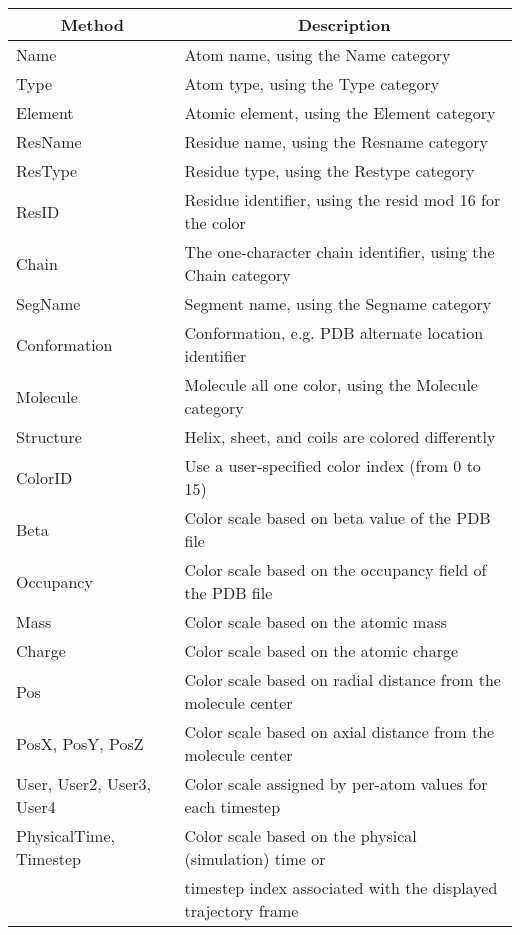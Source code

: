 \begin{table}[htb]
  \begin{tabular}{|l|l|} \hline
    \multicolumn{1}{|c}{Method} &
        \multicolumn{1}{|c|}{Description} \\ \hline\hline
    Name	& Atom name, using the Name category \\
    Type	& Atom type, using the Type category \\
    Element     & Atomic element, using the Element category \\
    ResName	& Residue name, using the Resname category \\
    ResType	& Residue type, using the Restype category \\
    ResID	& Residue identifier, using the resid mod 16 for the color \\
    Chain	& The one-character chain identifier,
			using the Chain category \\
    SegName	& Segment name, using the Segname category \\
    Conformation & Conformation, e.g. PDB alternate location identifier \\
    Molecule	& Molecule all one color, using the Molecule category \\
    Structure	& Helix, sheet, and coils are colored differently \\
    ColorID	& Use a user-specified color index (from 0 to 15) \\
    Beta	& Color scale based on beta value of the PDB file \\
    Occupancy	& Color scale based on the occupancy field of the PDB file \\
    Mass	& Color scale based on the atomic mass \\
    Charge	& Color scale based on the atomic charge \\
    Pos		& Color scale based on radial distance from the molecule center \\
    PosX, PosY, PosZ & Color scale based on axial distance from the molecule center \\
    User, User2, User3, User4  & Color scale assigned by per-atom values 
                for each timestep \\
    PhysicalTime, Timestep & Color scale based on the physical (simulation) time or \\
                & timestep index associated with the displayed trajectory frame \\

\end{tabular}
\end{table}
